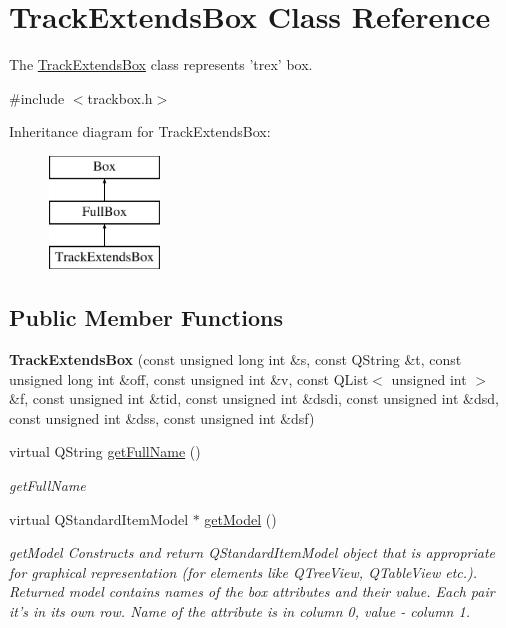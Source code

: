 \hypertarget{class_track_extends_box}{\section{Track\-Extends\-Box Class Reference}
\label{class_track_extends_box}
}


The \hyperlink{class_track_extends_box}{Track\-Extends\-Box} class represents 'trex' box.  




{\ttfamily \#include $<$trackbox.\-h$>$}

Inheritance diagram for Track\-Extends\-Box\-:\begin{figure}[H]
\begin{center}
\leavevmode
\includegraphics[height=3.000000cm]{class_track_extends_box}
\end{center}
\end{figure}
\subsection*{Public Member Functions}
\begin{DoxyCompactItemize}
\item 
\hypertarget{class_track_extends_box_a00228e707a14104abb330deba58e93dd}{{\bfseries Track\-Extends\-Box} (const unsigned long int \&s, const Q\-String \&t, const unsigned long int \&off, const unsigned int \&v, const Q\-List$<$ unsigned int $>$ \&f, const unsigned int \&tid, const unsigned int \&dsdi, const unsigned int \&dsd, const unsigned int \&dss, const unsigned int \&dsf)}\label{class_track_extends_box_a00228e707a14104abb330deba58e93dd}

\item 
virtual Q\-String \hyperlink{class_track_extends_box_acaa1a49911d86e5ca02ce2038398ff5d}{get\-Full\-Name} ()
\begin{DoxyCompactList}\small\item\em get\-Full\-Name \end{DoxyCompactList}\item 
virtual Q\-Standard\-Item\-Model $\ast$ \hyperlink{class_track_extends_box_a17e3133ff264960cb23e2431131da088}{get\-Model} ()
\begin{DoxyCompactList}\small\item\em get\-Model Constructs and return Q\-Standard\-Item\-Model object that is appropriate for graphical representation (for elements like Q\-Tree\-View, Q\-Table\-View etc.). Returned model contains names of the box attributes and their value. Each pair it's in its own row. Name of the attribute is in column 0, value -\/ column 1. \end{DoxyCompactList}\end{DoxyCompactItemize}
